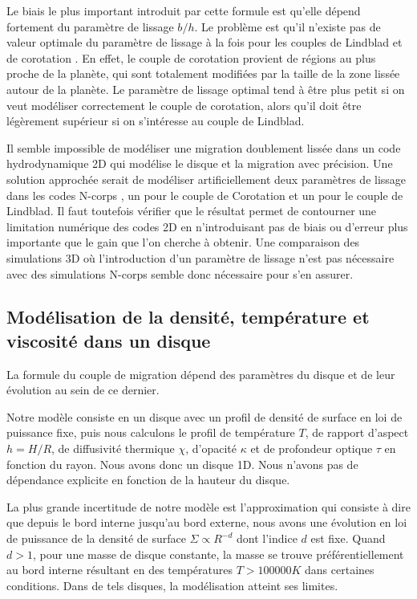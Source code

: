 Le biais le plus important introduit par cette formule est qu'elle dépend fortement du paramètre de lissage $b/h$. Le problème est qu'il n'existe pas de valeur optimale du paramètre de lissage à la fois pour les couples de Lindblad et de corotation \citep{masset2002coorbital}. En effet, le couple de corotation provient de régions au plus proche de la planète, qui sont totalement modifiées par la taille de la zone lissée autour de la planète. Le paramètre de lissage optimal tend à être plus petit si on veut modéliser correctement le couple de corotation, alors qu'il doit être légèrement supérieur si on s'intéresse au couple de Lindblad. 

Il semble impossible de modéliser une migration doublement lissée dans un code hydrodynamique 2D qui modélise le disque et la migration avec précision. Une solution approchée serait de modéliser artificiellement deux paramètres de lissage dans les codes N-corps , un pour le couple de Corotation et un pour le couple de Lindblad. Il faut toutefois vérifier que le résultat permet de contourner une limitation numérique des codes 2D en n'introduisant pas de biais ou d'erreur plus importante que le gain que l'on cherche à obtenir. Une comparaison des simulations 3D où l'introduction d'un paramètre de lissage n'est pas nécessaire avec des simulations N-corps semble donc nécessaire pour s'en assurer. 

\subsection{Modélisation de la densité, température et viscosité dans un disque}
La formule du couple de migration dépend des paramètres du disque et de leur évolution au sein de ce dernier. 

Notre modèle consiste en un disque avec un profil de densité de surface en loi de puissance fixe, puis nous calculons le profil de température $T$, de rapport d'aspect $h=H/R$, de diffusivité thermique $\chi$, d'opacité $\kappa$ et de profondeur optique $\tau$ en fonction du rayon. Nous avons donc un disque 1D. Nous n'avons pas de dépendance explicite en fonction de la hauteur du disque. 

La plus grande incertitude de notre modèle est l'approximation qui consiste à dire que depuis le bord interne jusqu'au bord externe, nous avons une évolution en loi de puissance de la densité de surface $\Sigma\propto R^{-d}$ dont l'indice $d$ est fixe. Quand $d>1$, pour une masse de disque constante, la masse se trouve préférentiellement au bord interne résultant en des températures $T>100 000\unit{K}$ dans certaines conditions. Dans de tels disques, la modélisation atteint ses limites.

